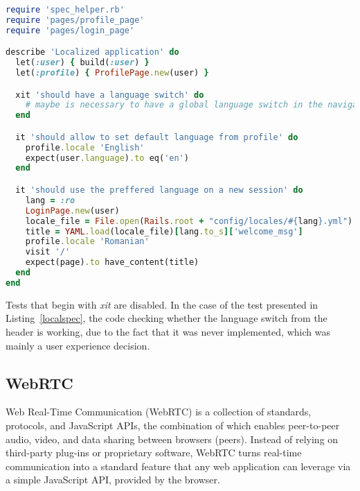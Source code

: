 \begin{lstlisting}[language=Ruby, caption={Localization specification}, label=localspec]
require 'spec_helper.rb'
require 'pages/profile_page'
require 'pages/login_page'

describe 'Localized application' do
  let(:user) { build(:user) }
  let(:profile) { ProfilePage.new(user) }

  xit 'should have a language switch' do
    # maybe is necessary to have a global language switch in the navigation bar
  end

  it 'should allow to set default language from profile' do
    profile.locale 'English'
    expect(user.language).to eq('en')
  end

  it 'should use the preffered language on a new session' do
    lang = :ro
    LoginPage.new(user)
    locale_file = File.open(Rails.root + "config/locales/#{lang}.yml")
    title = YAML.load(locale_file)[lang.to_s]['welcome_msg']
    profile.locale 'Romanian'
    visit '/'
    expect(page).to have_content(title)
  end
end
\end{lstlisting}

Tests that begin with \textit{xit} are disabled. In the case of the test presented in
Listing~\ref{localspec}, the code checking whether the language switch from the header is working, due
to the fact that it was never implemented, which was mainly a user experience decision.

\subsection{WebRTC}
Web Real-Time Communication (WebRTC) is a collection of standards, protocols,
and JavaScript APIs, the combination of which enables peer-to-peer audio, video,
and data sharing between browsers (peers). Instead of relying on third-party
plug-ins or proprietary software, WebRTC turns real-time communication into a
standard feature that any web application can leverage via a simple JavaScript
API, provided by the browser.

